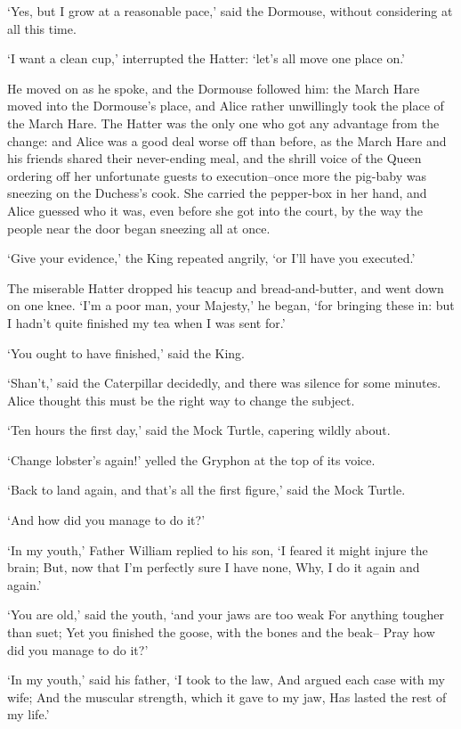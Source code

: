 \documentclass[statementpaper,twoside,openany]{memoir}
\begin{document}
`Yes, but I grow at a reasonable pace,' said the Dormouse, without considering at all this time.

`I want a clean cup,' interrupted the Hatter: `let's all move one place on.'

He moved on as he spoke, and the Dormouse followed him: the March Hare moved into the Dormouse's place, and Alice rather unwillingly took the place of the March Hare. The Hatter was the only one who got any advantage from the change: and Alice was a good deal worse off than before, as the March Hare and his friends shared their never-ending meal, and the shrill voice of the Queen ordering off her unfortunate guests to execution--once more the pig-baby was sneezing on the Duchess's cook. She carried the pepper-box in her hand, and Alice guessed who it was, even before she got into the court, by the way the people near the door began sneezing all at once.

`Give your evidence,' the King repeated angrily, `or I'll have you executed.'

The miserable Hatter dropped his teacup and bread-and-butter, and went down on one knee. `I'm a poor man, your Majesty,' he began, `for bringing these in: but I hadn't quite finished my tea when I was sent for.'

`You ought to have finished,' said the King.

`Shan't,' said the Caterpillar decidedly, and there was silence for some minutes. Alice thought this must be the right way to change the subject.

`Ten hours the first day,' said the Mock Turtle, capering wildly about.

`Change lobster's again!' yelled the Gryphon at the top of its voice.

`Back to land again, and that's all the first figure,' said the Mock Turtle.

`And how did you manage to do it?'

`In my youth,' Father William replied to his son, `I feared it might injure the brain; But, now that I'm perfectly sure I have none, Why, I do it again and again.'

`You are old,' said the youth, `and your jaws are too weak For anything tougher than suet; Yet you finished the goose, with the bones and the beak-- Pray how did you manage to do it?'

`In my youth,' said his father, `I took to the law, And argued each case with my wife; And the muscular strength, which it gave to my jaw, Has lasted the rest of my life.'
\end{document}
